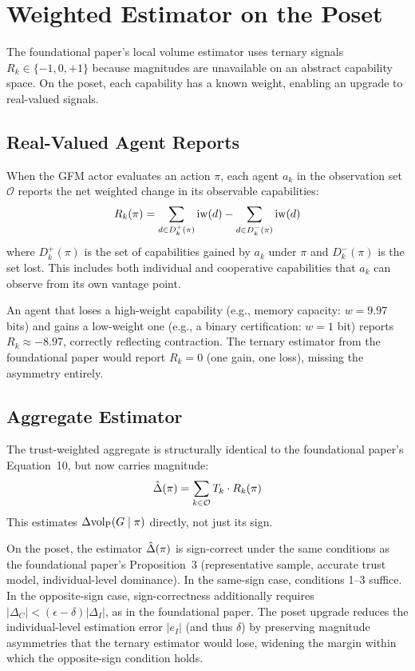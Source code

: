 \section{Weighted Estimator on the Poset}
\label{sec:estimator}

The foundational paper's local volume estimator uses ternary signals $R_k \in
\{-1, 0, +1\}$ because magnitudes are unavailable on an abstract capability
space. On the poset, each capability has a known weight, enabling an upgrade
to real-valued signals.

\subsection{Real-Valued Agent Reports}

When the GFM actor evaluates an action $\pi$, each agent $a_k$ in the
observation set $\mathcal{O}$ reports the net weighted change in its
observable capabilities:
\begin{equation}
\label{eq:weighted_report}
R_k(\pi) = \sum_{d \in D_k^+(\pi)} \operatorname{iw}(d) - \sum_{d \in D_k^-(\pi)} \operatorname{iw}(d)
\end{equation}
where $D_k^+(\pi)$ is the set of capabilities gained by $a_k$ under $\pi$ and
$D_k^-(\pi)$ is the set lost. This includes both individual and cooperative
capabilities that $a_k$ can observe from its own vantage point.

An agent that loses a high-weight capability (e.g., memory capacity: $w =
9.97$ bits) and gains a low-weight one (e.g., a binary certification: $w = 1$
bit) reports $R_k \approx -8.97$, correctly reflecting contraction. The
ternary estimator from the foundational paper would report $R_k = 0$ (one
gain, one loss), missing the asymmetry entirely.

\subsection{Aggregate Estimator}

The trust-weighted aggregate is structurally identical to the foundational
paper's Equation~10, but now carries magnitude:
\begin{equation}
\label{eq:weighted_estimator}
\hat{\Delta}(\pi) = \sum_{k \in \mathcal{O}} T_k \cdot R_k(\pi)
\end{equation}
This estimates $\Delta {\operatorname{vol}_{\mathrm{P}}}(G \mid \pi)$ directly, not just its sign.

\begin{proposition}
\label{prop:sign_correctness}
On the poset, the estimator $\hat{\Delta}(\pi)$ is sign-correct under the
    same conditions as the foundational paper's Proposition~3 (representative
    sample, accurate trust model, individual-level dominance). In the
    same-sign case, conditions 1--3 suffice. In the opposite-sign case,
    sign-correctness additionally requires $|\Delta_C| < (\epsilon -
    \delta)|\Delta_I|$, as in the foundational paper. The poset upgrade
    reduces the individual-level estimation error $|e_I|$ (and thus $\delta$)
    by preserving magnitude asymmetries that the ternary estimator would lose,
    widening the margin within which the opposite-sign condition holds.
\end{proposition}

